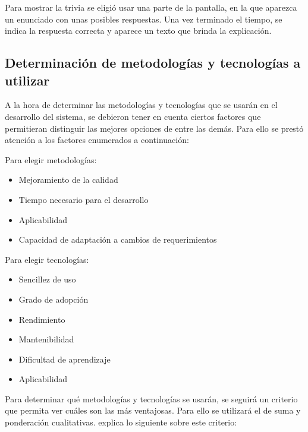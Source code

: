 \documentclass[twoside]{article}
\begin{document}
Para mostrar la trivia se eligió usar una parte de la pantalla, en la que aparezca un enunciado con unas posibles respuestas. Una vez terminado el tiempo, se indica la respuesta correcta y aparece un texto que brinda la explicación.
\subsection{Determinación de metodologías y tecnologías a utilizar}
A la hora de determinar las metodologías y tecnologías que se usarán en el desarrollo del sistema, se debieron tener en cuenta ciertos factores que permitieran distinguir las mejores opciones de entre las demás. Para ello se prestó atención a los factores enumerados a continuación:

Para elegir metodologías:
\begin{itemize}
    \item Mejoramiento de la calidad
    \item Tiempo necesario para el desarrollo
    \item Aplicabilidad
    \item Capacidad de adaptación a cambios de requerimientos
\end{itemize}
Para elegir tecnologías:
\begin{itemize}
    \item Sencillez de uso
    \item Grado de adopción
    \item Rendimiento
    \item Mantenibilidad
    \item Dificultad de aprendizaje
    \item Aplicabilidad
\end{itemize}
Para determinar qué metodologías y tecnologías se usarán, se seguirá un criterio que permita ver cuáles son las más ventajosas. Para ello se utilizará el de suma y ponderación cualitativas. \textcite{scriven} explica lo siguiente sobre este criterio: 
\end{document}

